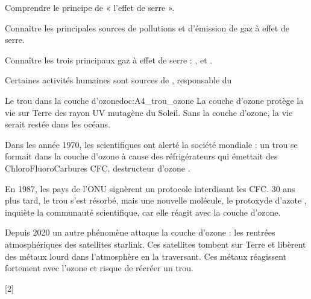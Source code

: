 \teteTermStssEnvi
{}

\begin{objectifs}
  \item Comprendre le principe de « l'effet de serre ».
  \item Connaître les principales sources de pollutions et d'émission de gaz à effet de serre.
  \item Connaître les trois principaux gaz à effet de serre : \dioxydeDeCarbone, \methane et \eau.
\end{objectifs}

\begin{contexte}
  Certaines activités humaines sont sources de , responsable du 
  
\end{contexte}

\begin{doc}{Le trou dans la couche d'ozone}{doc:A4_trou_ozone}
  La couche d'ozone protège la vie sur Terre des rayon UV mutagène du Soleil.
  Sans la couche d'ozone, la vie serait restée dans les océans.

  Dans les année 1970, les scientifiques ont alerté la société mondiale : un trou se formait dans la couche d'ozone à cause des réfrigérateurs qui émettait des ChloroFluoroCarbures CFC, destructeur d'ozone .

  En 1987, les pays de l'ONU signèrent un protocole interdisant les CFC.
  30 ans plus tard, le trou s'est résorbé, mais une nouvelle molécule, le protoxyde d'azote , inquiète la communauté scientifique, car elle réagit avec la couche d'ozone.
  
  Depuis 2020 un autre phénomène attaque la couche d'ozone : les rentrées atmosphériques des satellites starlink.
  Ces satellites tombent sur Terre et libèrent des métaux lourd dans l’atmosphère en la traversant. Ces métaux réagissent fortement avec l'ozone et risque de récréer un trou.
\end{doc}

[2]


